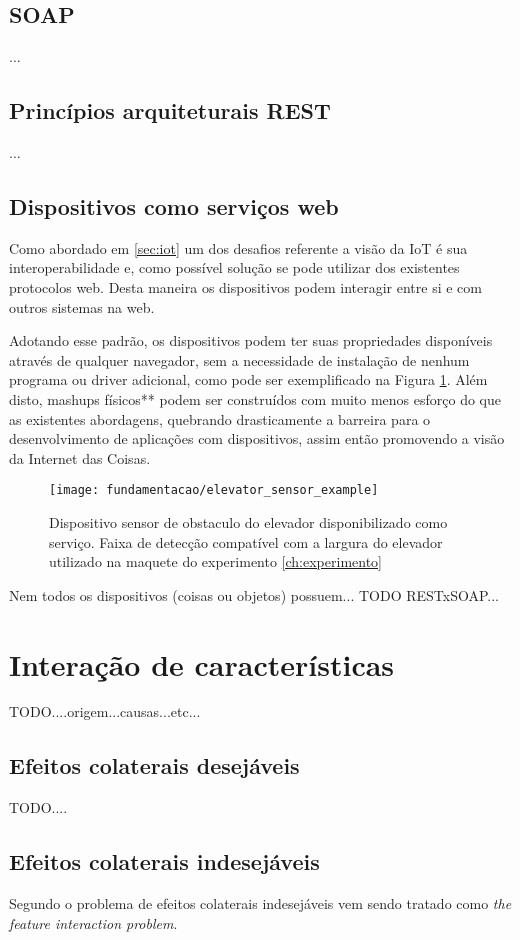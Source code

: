 \subsection{SOAP}
\label{subsec:soap}
...

\subsection{Princípios arquiteturais REST}
...
\subsection{Dispositivos como serviços web}
\label{subsec:dispositivosweb}
Como abordado em \ref{sec:iot} um dos desafios referente a visão da IoT é sua interoperabilidade e, como possível solução se pode utilizar dos existentes protocolos web. Desta maneira os dispositivos podem interagir entre si e com outros sistemas na web.

Adotando esse padrão, os dispositivos podem ter suas propriedades disponíveis através de qualquer navegador, sem a necessidade de instalação de nenhum programa ou driver adicional, como pode ser exemplificado na Figura \ref{fig:dispnavegador}. Além disto, mashups físicos** podem ser construídos com muito menos esforço do que as existentes abordagens, quebrando drasticamente a barreira para o desenvolvimento de aplicações com dispositivos, assim então promovendo a visão da Internet das Coisas.\cite{Guinard:2009}

\begin{figure}[!htb] \centering 
  \centering
  \texttt{[image: fundamentacao/elevator\_sensor\_example]} 
  \caption{Dispositivo sensor de obstaculo do elevador disponibilizado como serviço. Faixa de detecção compatível com a largura do elevador utilizado na maquete do experimento    \ref{ch:experimento}} 
  \label{fig:dispnavegador}
\end{figure}


Nem todos os dispositivos (coisas ou objetos) possuem... TODO RESTxSOAP...

\section{Interação de características}
TODO....origem...causas...etc...
\subsection{Efeitos colaterais desejáveis}
TODO....
\subsection{Efeitos colaterais indesejáveis}
Segundo \cite{Weiss:2007}o problema de efeitos colaterais indesejáveis vem sendo tratado como \textit{the feature interaction problem}.

